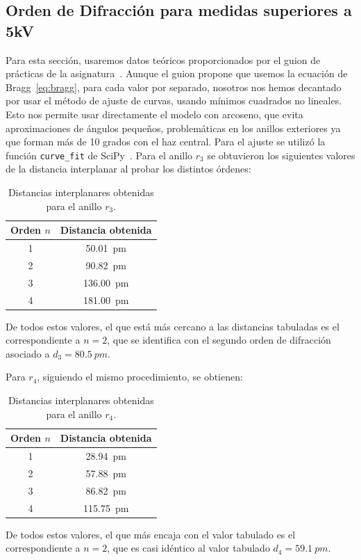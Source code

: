 \documentclass[a4paper,11pt]{article}
\begin{document}
\subsection{Orden de Difracción para medidas superiores a 5kV}
Para esta sección, usaremos datos teóricos proporcionados por el guion de prácticas
de la asignatura~\cite{guioncuantica2026}.
Aunque el guion propone que usemos la ecuación de Bragg~\eqref{eq:bragg}, para cada valor por separado, nosotros nos hemos 
decantado por usar el método de ajuste de curvas, usando mínimos cuadrados no lineales. Esto nos permite usar directamente el modelo con arcoseno, 
que evita aproximaciones de ángulos pequeños, problemáticas en los anillos exteriores ya que forman más de 10 grados con el haz central. Para el ajuste se utilizó
la función \texttt{curve\_fit} de SciPy~\cite{scipycurvefit}.
Para el anillo $r_3$ se obtuvieron los siguientes valores de la distancia
interplanar al probar los distintos órdenes:
\begin{table}[H]
    \centering
    \caption{Distancias interplanares obtenidas para el anillo \(r_3\).}
    \begin{tabular}{cc}
        \toprule
        Orden \(n\) & Distancia obtenida \\
        \midrule
        1 & \SI{50.01}{pm} \\
        2 & \SI{90.82}{pm} \\
        3 & \SI{136.00}{pm} \\
        4 & \SI{181.00}{pm} \\
        \bottomrule
    \end{tabular}
\end{table}
De todos estos valores, el que está más cercano a las distancias tabuladas
es el correspondiente a $n=2$, que se identifica con el segundo orden de
difracción asociado a $d_3=\SI{80.5}{pm}$.

Para $r_4$, siguiendo el mismo procedimiento, se obtienen:
\begin{table}[H]
    \centering
    \caption{Distancias interplanares obtenidas para el anillo \(r_4\).}
    \begin{tabular}{cc}
        \toprule
        Orden \(n\) & Distancia obtenida \\
        \midrule
        1 & \SI{28.94}{pm} \\
        2 & \SI{57.88}{pm} \\
        3 & \SI{86.82}{pm} \\
        4 & \SI{115.75}{pm} \\
        \bottomrule
    \end{tabular}
\end{table}
De todos estos valores, el que más encaja con el valor tabulado es el
correspondiente a $n=2$, que es casi idéntico al valor tabulado
$d_4=\SI{59.1}{pm}$.
\end{document}
